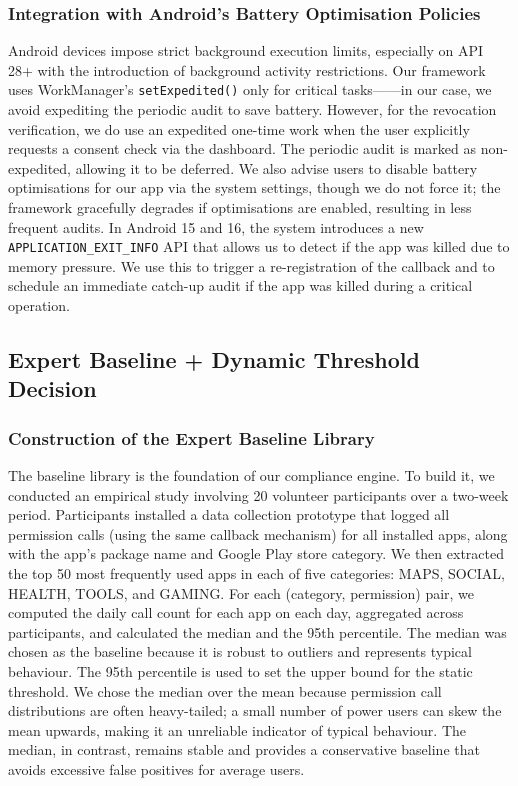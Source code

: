 \subsubsection{Integration with Android's Battery Optimisation Policies}

Android devices impose strict background execution limits, especially on API 28+ with the introduction of background activity restrictions. Our framework uses WorkManager's \texttt{setExpedited()} only for critical tasks——in our case, we avoid expediting the periodic audit to save battery. However, for the revocation verification, we do use an expedited one-time work when the user explicitly requests a consent check via the dashboard. The periodic audit is marked as non-expedited, allowing it to be deferred. We also advise users to disable battery optimisations for our app via the system settings, though we do not force it; the framework gracefully degrades if optimisations are enabled, resulting in less frequent audits. In Android 15 and 16, the system introduces a new \texttt{APPLICATION\_EXIT\_INFO} API that allows us to detect if the app was killed due to memory pressure. We use this to trigger a re-registration of the callback and to schedule an immediate catch-up audit if the app was killed during a critical operation.

\subsection{Expert Baseline + Dynamic Threshold Decision}

\subsubsection{Construction of the Expert Baseline Library}

The baseline library is the foundation of our compliance engine. To build it, we conducted an empirical study involving 20 volunteer participants over a two-week period. Participants installed a data collection prototype that logged all permission calls (using the same callback mechanism) for all installed apps, along with the app's package name and Google Play store category. We then extracted the top 50 most frequently used apps in each of five categories: MAPS, SOCIAL, HEALTH, TOOLS, and GAMING. For each (category, permission) pair, we computed the daily call count for each app on each day, aggregated across participants, and calculated the median and the 95th percentile. The median was chosen as the baseline because it is robust to outliers and represents typical behaviour. The 95th percentile is used to set the upper bound for the static threshold. We chose the median over the mean because permission call distributions are often heavy-tailed; a small number of power users can skew the mean upwards, making it an unreliable indicator of typical behaviour. The median, in contrast, remains stable and provides a conservative baseline that avoids excessive false positives for average users.

